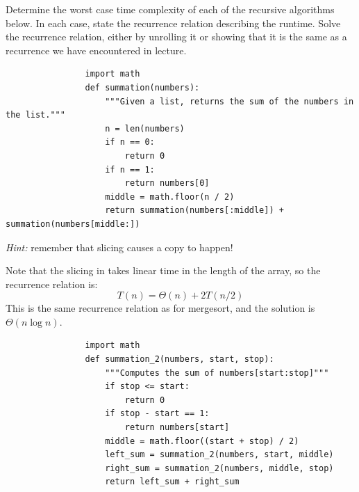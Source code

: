 \begin{prob}
    Determine the worst case time complexity of each of the recursive algorithms below.
    In each case, state the recurrence relation describing the runtime. Solve the recurrence
    relation, either by unrolling it or showing that it is the same as a recurrence we have
    encountered in lecture.

    \begin{subprobset}
        \begin{subprob}
            \begin{verbatim}
                import math
                def summation(numbers):
                    """Given a list, returns the sum of the numbers in the list."""
                    n = len(numbers)
                    if n == 0:
                        return 0
                    if n == 1:
                        return numbers[0]
                    middle = math.floor(n / 2)
                    return summation(numbers[:middle]) + summation(numbers[middle:])
            \end{verbatim}

            \emph{Hint:} remember that slicing causes a copy to happen!

            \begin{soln}
                Note that the slicing in  takes linear time
                in the length of the array, so the recurrence relation is:
                \[
                    T(n) = \Theta(n) + 2T(n/2)
                \]
                This is the same recurrence relation as for mergesort, and the solution
                is $\Theta(n \log n)$.
            \end{soln}
        \end{subprob}


        \begin{subprob}
            \begin{verbatim}
                import math
                def summation_2(numbers, start, stop):
                    """Computes the sum of numbers[start:stop]"""
                    if stop <= start:
                        return 0
                    if stop - start == 1:
                        return numbers[start]
                    middle = math.floor((start + stop) / 2)
                    left_sum = summation_2(numbers, start, middle)
                    right_sum = summation_2(numbers, middle, stop)
                    return left_sum + right_sum
            \end{verbatim}


\end{subprob}
\end{subprobset}
\end{prob}
